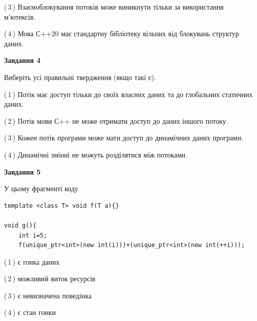 \documentclass[12pt, ukrainian]{article}
\begin{document}
\begin {large}
{(\,3\,) Взаємоблокування потоків може виникнути тільки за використання м’ютексів.%

(\,4\,) Мова С++20 має стандартну бібліотеку вільних від блокувань структур даних.%



\begin{center}
\textbf{Завдання 4}
\end{center}
Виберіть усі правильні твердження (якщо такі є).\par
\vspace{2mm}

(\,1\,) Потік має доступ тільки до своїх власних даних та до глобальних статичних даних.%

(\,2\,) Потік мови С++ не може отримати доступ до даних іншого потоку.%

(\,3\,) Кожен потік програми може мати доступ до динамічних даних програми.%

(\,4\,) Динамічні змінні не можуть розділятися між потоками.%



\begin{center}
\textbf{Завдання 5}
\end{center}
У цьому фрагменті коду
\begin{verbatim}
template <class T> void f(T a){}

void g(){
    int i=5;
    f(unique_ptr<int>(new int(i)))+(unique_ptr<int>(new int(++i)));
\end{verbatim}
(\,1\,) є гонка даних%

(\,2\,) можливий виток ресурсів%

(\,3\,) є невизначена поведінка%

(\,4\,) є стан гонки%


}
\end {large}
\end{document}

